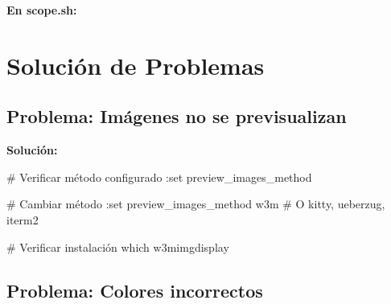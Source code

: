 \documentclass[
  doc,
  floatsintext,
  longtable,
  a4paper,
  nolmodern,
  notxfonts,
  notimes,
  12pt,
  colorlinks=true,linkcolor=blue,citecolor=blue,urlcolor=blue]{apa7}
\newenvironment{Shaded}{\begin{snugshade}}{\end{snugshade}}
\newcommand{\AttributeTok}[1]{\textcolor[rgb]{0.40,0.45,0.13}{#1}}
\newcommand{\BuiltInTok}[1]{\textcolor[rgb]{0.00,0.23,0.31}{#1}}
\newcommand{\CommentTok}[1]{\textcolor[rgb]{0.37,0.37,0.37}{#1}}
\newcommand{\ErrorTok}[1]{\textcolor[rgb]{0.68,0.00,0.00}{#1}}
\newcommand{\ExtensionTok}[1]{\textcolor[rgb]{0.00,0.23,0.31}{#1}}
\newcommand{\FunctionTok}[1]{\textcolor[rgb]{0.28,0.35,0.67}{#1}}
\newcommand{\KeywordTok}[1]{\textcolor[rgb]{0.00,0.23,0.31}{\textbf{#1}}}
\newcommand{\NormalTok}[1]{\textcolor[rgb]{0.00,0.23,0.31}{#1}}
\newcommand{\StringTok}[1]{\textcolor[rgb]{0.13,0.47,0.30}{#1}}
\newcommand{\VariableTok}[1]{\textcolor[rgb]{0.07,0.07,0.07}{#1}}
\begin{document}
\textbf{En scope.sh:}

\begin{Shaded}
\end{Shaded}

\section{Solución de Problemas}\label{soluciuxf3n-de-problemas}

\subsection{Problema: Imágenes no se
previsualizan}\label{problema-imuxe1genes-no-se-previsualizan}

\textbf{Solución:}

\begin{Shaded}
\begin{Highlighting}[]
\CommentTok{\# Verificar método configurado}
\ExtensionTok{:set}\NormalTok{ preview\_images\_method}

\CommentTok{\# Cambiar método}
\ExtensionTok{:set}\NormalTok{ preview\_images\_method w3m}
\CommentTok{\# O kitty, ueberzug, iterm2}

\CommentTok{\# Verificar instalación}
\FunctionTok{which}\NormalTok{ w3mimgdisplay}
\end{Highlighting}
\end{Shaded}

\subsection{Problema: Colores
incorrectos}\label{problema-colores-incorrectos}
\end{document}
